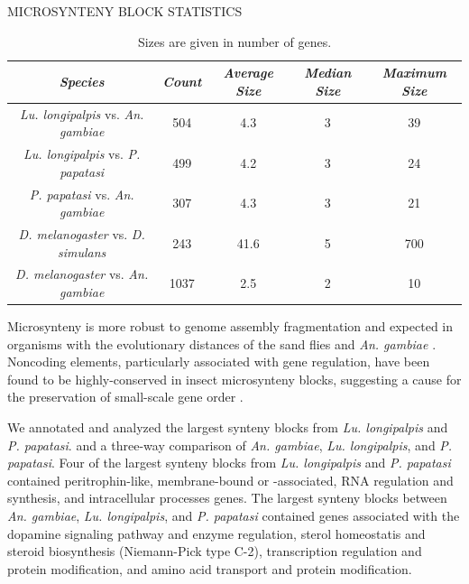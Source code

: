 \begin{table}[H]
  \centering
  \caption{MICROSYNTENY BLOCK STATISTICS}
  \begin{tabular}{c c c c c} \hline
    \emph{Species} & \emph{Count} & \emph{Average Size} & \emph{Median Size} & \emph{Maximum Size} \\ \hline
    \emph{Lu. longipalpis} vs. \emph{An. gambiae} & 504 & 4.3 & 3 & 39 \\
    \emph{Lu. longipalpis} vs. \emph{P. papatasi} & 499 & 4.2 & 3 & 24 \\
    \emph{P. papatasi} vs. \emph{An. gambiae} & 307 & 4.3 & 3 & 21 \\
    \emph{D. melanogaster} vs. \emph{D. simulans} & 243 & 41.6 & 5 & 700 \\
    \emph{D. melanogaster} vs. \emph{An. gambiae} & 1037 & 2.5 & 2 & 10
  \end{tabular}
  \caption*{Sizes are given in number of genes.}
  \label{tab:synteny-block-stats}
\end{table}

Microsynteny is more robust to genome assembly fragmentation and expected in organisms with the evolutionary distances of the sand flies and \emph{An. gambiae} \cite{Zdobnov2002}. Noncoding elements, particularly associated with gene regulation, have been found to be highly-conserved in insect microsynteny blocks, suggesting a cause for the preservation of small-scale gene order \cite{Engstrom2007}.

We annotated and analyzed the largest synteny blocks from \emph{Lu. longipalpis} and \emph{P. papatasi}. and a three-way comparison of \emph{An. gambiae}, \emph{Lu. longipalpis}, and \emph{P. papatasi}.  Four of the largest synteny blocks from \emph{Lu. longipalpis} and \emph{P. papatasi} contained peritrophin-like, membrane-bound or -associated, RNA regulation and synthesis, and intracellular processes genes. The largest synteny blocks between \emph{An. gambiae}, \emph{Lu. longipalpis}, and \emph{P. papatasi} contained genes associated with the dopamine signaling pathway and enzyme regulation, sterol homeostatis and steroid biosynthesis (Niemann-Pick type C-2), transcription regulation and protein modification, and amino acid transport and protein modification.

